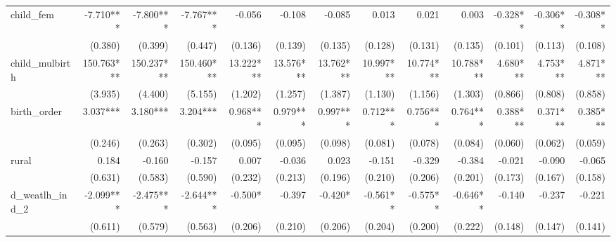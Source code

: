 \begin{tabular}{lrrrrrrrrrrrr}
child\_fem                                  &    -7.710*** &    -7.800*** &    -7.767*** &       -0.056 &       -0.108 &       -0.085 &        0.013 &        0.021 &        0.003 &     -0.328** &     -0.306** &     -0.308** \\ 
                                            &      (0.380) &      (0.399) &      (0.447) &      (0.136) &      (0.139) &      (0.135) &      (0.128) &      (0.131) &      (0.135) &      (0.101) &      (0.113) &      (0.108) \\ 
child\_mulbirth                             &   150.763*** &   150.237*** &   150.460*** &    13.222*** &    13.576*** &    13.762*** &    10.997*** &    10.774*** &    10.788*** &     4.680*** &     4.753*** &     4.871*** \\ 
                                            &      (3.935) &      (4.400) &      (5.155) &      (1.202) &      (1.257) &      (1.387) &      (1.130) &      (1.156) &      (1.303) &      (0.866) &      (0.808) &      (0.858) \\ 
birth\_order                                &     3.037*** &     3.180*** &     3.204*** &     0.968*** &     0.979*** &     0.997*** &     0.712*** &     0.756*** &     0.764*** &     0.388*** &     0.371*** &     0.385*** \\ 
                                            &      (0.246) &      (0.263) &      (0.302) &      (0.095) &      (0.095) &      (0.098) &      (0.081) &      (0.078) &      (0.084) &      (0.060) &      (0.062) &      (0.059) \\ 
rural                                       &        0.184 &       -0.160 &       -0.157 &        0.007 &       -0.036 &        0.023 &       -0.151 &       -0.329 &       -0.384 &       -0.021 &       -0.090 &       -0.065 \\ 
                                            &      (0.631) &      (0.583) &      (0.590) &      (0.232) &      (0.213) &      (0.196) &      (0.210) &      (0.206) &      (0.201) &      (0.173) &      (0.167) &      (0.158) \\ 
d\_weatlh\_ind\_2                           &    -2.099*** &    -2.475*** &    -2.644*** &      -0.500* &       -0.397 &      -0.420* &     -0.561** &     -0.575** &     -0.646** &       -0.140 &       -0.237 &       -0.221 \\ 
                                            &      (0.611) &      (0.579) &      (0.563) &      (0.206) &      (0.210) &      (0.206) &      (0.204) &      (0.200) &      (0.222) &      (0.148) &      (0.147) &      (0.141) \\ 

\end{tabular}
